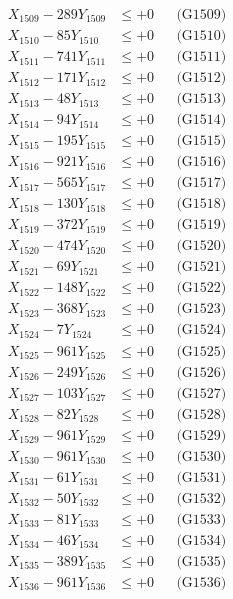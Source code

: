 \documentclass[a4paper,10pt]{article}
\begin{document}
{\begin{align}
X_{1509} - 289Y_{1509} &\leq +0 && \text{(G1509)} \\
X_{1510} - 85Y_{1510} &\leq +0 && \text{(G1510)} \\
\allowbreak
X_{1511} - 741Y_{1511} &\leq +0 && \text{(G1511)} \\
X_{1512} - 171Y_{1512} &\leq +0 && \text{(G1512)} \\
X_{1513} - 48Y_{1513} &\leq +0 && \text{(G1513)} \\
X_{1514} - 94Y_{1514} &\leq +0 && \text{(G1514)} \\
X_{1515} - 195Y_{1515} &\leq +0 && \text{(G1515)} \\
X_{1516} - 921Y_{1516} &\leq +0 && \text{(G1516)} \\
X_{1517} - 565Y_{1517} &\leq +0 && \text{(G1517)} \\
X_{1518} - 130Y_{1518} &\leq +0 && \text{(G1518)} \\
X_{1519} - 372Y_{1519} &\leq +0 && \text{(G1519)} \\
X_{1520} - 474Y_{1520} &\leq +0 && \text{(G1520)} \\
\allowbreak
X_{1521} - 69Y_{1521} &\leq +0 && \text{(G1521)} \\
X_{1522} - 148Y_{1522} &\leq +0 && \text{(G1522)} \\
X_{1523} - 368Y_{1523} &\leq +0 && \text{(G1523)} \\
X_{1524} - 7Y_{1524} &\leq +0 && \text{(G1524)} \\
X_{1525} - 961Y_{1525} &\leq +0 && \text{(G1525)} \\
X_{1526} - 249Y_{1526} &\leq +0 && \text{(G1526)} \\
X_{1527} - 103Y_{1527} &\leq +0 && \text{(G1527)} \\
X_{1528} - 82Y_{1528} &\leq +0 && \text{(G1528)} \\
X_{1529} - 961Y_{1529} &\leq +0 && \text{(G1529)} \\
X_{1530} - 961Y_{1530} &\leq +0 && \text{(G1530)} \\
\allowbreak
X_{1531} - 61Y_{1531} &\leq +0 && \text{(G1531)} \\
X_{1532} - 50Y_{1532} &\leq +0 && \text{(G1532)} \\
X_{1533} - 81Y_{1533} &\leq +0 && \text{(G1533)} \\
X_{1534} - 46Y_{1534} &\leq +0 && \text{(G1534)} \\
X_{1535} - 389Y_{1535} &\leq +0 && \text{(G1535)} \\
X_{1536} - 961Y_{1536} &\leq +0 && \text{(G1536)} \\

\end{align}}
\end{document}
